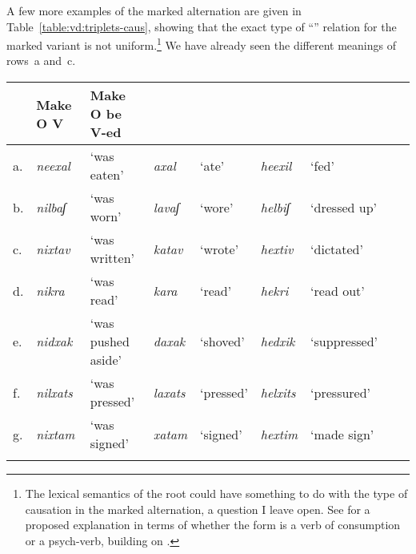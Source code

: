 \begin{exe}
\begin{xlist}
\begin{xlist}
\begin{exe}
\begin{exe}
\begin{xlist}
\begin{exe}
\begin{xlist}
\begin{exe}
\begin{xlist}
\begin{xlist}
\begin{exe}
\begin{xlist}
\begin{exe}
\begin{xlist}
\begin{exe}
\begin{exe}
\begin{exe}
\begin{xlist}
\begin{exe}
\begin{exe}
\begin{xlist}
\begin{xlist}
\begin{exe}
\begin{xlist}
\begin{exe}
\begin{exe}
\begin{exe}
\begin{xlist}
\begin{exe}
\begin{exe}
\begin{xlist}
\begin{exe}
\begin{xlist}
\begin{exe}
\begin{xlist}
\begin{exe}
\begin{xlist}
\begin{exe}
\begin{exe}
\begin{xlist}
\begin{exe}
\begin{exe}
\begin{xlist}
\begin{xlist}
\begin{exe}
\begin{xlist}
\begin{xlist}
\begin{exe}
\begin{xlist}
\begin{exe}
\begin{xlist}
A few more examples of the marked alternation are given in Table~\ref{table:vd:triplets-caus}, showing that the exact type of ``'' relation for the marked variant is not uniform.\footnote{The lexical semantics of the root could have something to do with the type of causation in the marked alternation, a question I leave open. See \citet[44]{doron03} for a proposed explanation in terms of whether the {\tkal} form is a verb of consumption or a psych-verb, building on \cite{colesridhar77}.} We have already seen the different meanings of rows~a and~c.
\begin{sidewaystable}
	\begin{tabularx}{\textwidth}{lllllllcc}
 \lsptoprule
		\multicolumn{7}{c}{}		& Make O V	& Make O be V-ed\\\midrule
		 a.& \emph{neexal}	& `was eaten'	& \emph{axal} & `ate'		& \emph{heexil} & `fed'			& \cmark	& \xmark\\
		 b.& \emph{nilbaʃ}	& `was worn'	& \emph{lavaʃ} & `wore' 	& \emph{helbiʃ}	&	`dressed up' 	& \cmark	& \xmark\\\tablevspace
		 c.& \emph{nixtav} & `was written' & \emph{katav} & `wrote' & \emph{hextiv} & `dictated' & \xmark	& \cmark\\
		d.& \emph{nikra}	& `was read'	& \emph{kara} & `read'		& \emph{hekri}	& `read out'	& \xmark	& \cmark \\
		e.&	\emph{nidxak}	& `was pushed aside'	& \emph{daxak}	& `shoved'	& \emph{hedxik}	& `suppressed'\footnotemark	& \xmark	& \cmark\\
		f.& \emph{nilxats}	& `was pressed' &  \emph{laxats} & `pressed'	& \emph{helxits} & `pressured'	& \xmark	& \cmark \\\tablevspace
		 g.& \emph{nixtam}	& `was signed'	& \emph{xatam} & `signed'	& \emph{hextim}	& `made sign'	& \cmark	& \cmark\\\tablevspace

\end{tabularx}
\end{sidewaystable}
\end{xlist}
\end{exe}
\end{xlist}
\end{exe}
\end{xlist}
\end{xlist}
\end{exe}
\end{xlist}
\end{xlist}
\end{exe}
\end{exe}
\end{xlist}
\end{exe}
\end{exe}
\end{xlist}
\end{exe}
\end{xlist}
\end{exe}
\end{xlist}
\end{exe}
\end{xlist}
\end{exe}
\end{exe}
\end{xlist}
\end{exe}
\end{exe}
\end{exe}
\end{xlist}
\end{exe}
\end{xlist}
\end{xlist}
\end{exe}
\end{exe}
\end{xlist}
\end{exe}
\end{exe}
\end{exe}
\end{xlist}
\end{exe}
\end{xlist}
\end{exe}
\end{xlist}
\end{xlist}
\end{exe}
\end{xlist}
\end{exe}
\end{xlist}
\end{exe}
\end{exe}
\end{xlist}
\end{xlist}
\end{exe}
